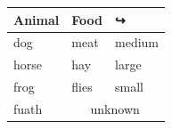 \documentclass{article}
\begin{document}
\begin{tabular}{lll}
\toprule
\multicolumn{1}{c}{Animal} & \multicolumn{1}{c}{Food} &
↪ \multicolumn{1}{c}{Size} \\
\midrule
dog & meat & medium \\
horse & hay & large \\
frog & flies & small \\
fuath & \multicolumn{2}{c}{unknown} \\
\bottomrule
\end{tabular}
\end{document}
